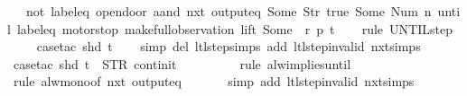 \begin{isabellebody}
\ \ \ {\isachardoublequoteopen}{\isacharparenleft}{\isacharparenleft}not\ {\isacharparenleft}label{\isacharunderscore}eq\ {\isacharprime}{\isacharprime}opendoor{\isacharprime}{\isacharprime}\ aand\ nxt\ {\isacharparenleft}output{\isacharunderscore}eq\ {\isacharbrackleft}Some\ {\isacharparenleft}Str\ {\isacharprime}{\isacharprime}true{\isacharprime}{\isacharprime}{\isacharparenright}{\isacharcomma}\ Some\ {\isacharparenleft}Num\ n{\isacharparenright}{\isacharbrackright}{\isacharparenright}{\isacharparenright}{\isacharparenright}\ until\ {\isacharparenleft}label{\isacharunderscore}eq\ {\isacharprime}{\isacharprime}motorstop{\isacharprime}{\isacharprime}{\isacharparenright}{\isacharparenright}\ {\isacharparenleft}make{\isacharunderscore}full{\isacharunderscore}observation\ lift\ {\isacharparenleft}Some\ {}{\isacharparenright}\ r\ p\ t{\isacharparenright}{\isachardoublequoteclose}\isanewline
%
\isadelimproof
\ \ %
\endisadelimproof
%
\isatagproof
{}\isamarkupfalse%
\ {\isacharparenleft}rule\ UNTIL{\isachardot}step{\isacharparenright}\isanewline
\ \ \ \isamarkupfalse%
\ {\isacharparenleft}case{\isacharunderscore}tac\ {\isachardoublequoteopen}shd\ t{\isachardoublequoteclose}{\isacharparenright}\isanewline
\ \ \isamarkupfalse%
\ {\isacharparenleft}simp\ del{\isacharcolon}\ ltl{\isacharunderscore}step{\isachardot}simps\ add{\isacharcolon}\ ltl{\isacharunderscore}step{\isacharunderscore}{}{\isacharunderscore}invalid\ nxt{\isachardot}simps{\isacharparenright}\isanewline
\ \ \isamarkupfalse%
\ {\isacharparenleft}case{\isacharunderscore}tac\ {\isachardoublequoteopen}shd\ t\ {\isacharequal}\ {\isacharparenleft}STR\ {\isacharprime}{\isacharprime}continit{\isacharprime}{\isacharprime}{\isacharcomma}\ {\isacharbrackleft}{\isacharbrackright}{\isacharparenright}{\isachardoublequoteclose}{\isacharparenright}\isanewline
\ \ \ \isamarkupfalse%
\isanewline
\ \ \ \isamarkupfalse%
\ {\isacharparenleft}rule\ alw{\isacharunderscore}implies{\isacharunderscore}until{\isacharparenright}\isanewline
\ \ \ \isamarkupfalse%
\ {\isacharparenleft}rule\ alw{\isacharunderscore}mono{\isacharbrackleft}of\ {\isachardoublequoteopen}nxt\ {\isacharparenleft}output{\isacharunderscore}eq\ {\isacharbrackleft}{\isacharbrackright}{\isacharparenright}{\isachardoublequoteclose}{\isacharbrackright}{\isacharparenright}\isanewline
\ \ \ \ \isamarkupfalse%
\ {\isacharparenleft}simp\ add{\isacharcolon}\ ltl{\isacharunderscore}step{\isacharunderscore}{}{\isacharunderscore}invalid\ nxt{\isachardot}simps{\isacharparenright}\isanewline

\end{isabellebody}
